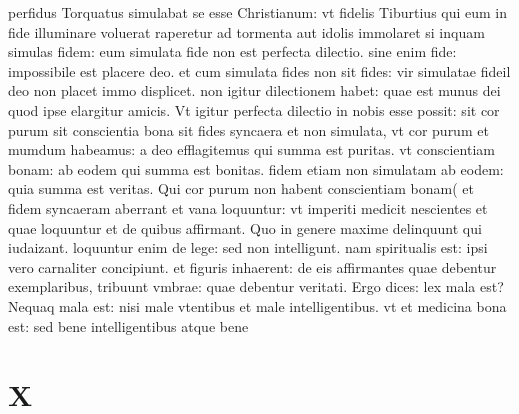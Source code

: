 \documentclass{article}
\begin{document}
\begin{pages}
perfidus Torquatus simulabat se esse Christianum: vt fidelis Tiburtius qui eum in fide illuminare voluerat raperetur ad tormenta aut idolis immolaret si inquam simulas fidem: eum simulata fide non est perfecta dilectio. sine enim fide: impossibile est placere deo. et cum simulata fides non sit fides: vir simulatae fideil deo non placet immo displicet. non igitur dilectionem habet: quae est munus dei quod ipse elargitur amicis. Vt igitur perfecta dilectio in nobis esse possit: sit cor purum sit conscientia bona sit fides syncaera et non simulata, vt cor purum et mumdum habeamus: a deo efflagitemus qui summa est puritas. vt conscientiam bonam: ab eodem qui summa est bonitas. fidem etiam non simulatam ab eodem: quia summa est veritas. Qui cor purum non habent conscientiam bonam( et fidem syncaeram aberrant et vana loquuntur: vt imperiti medicit nescientes et quae loquuntur et de quibus affirmant. Quo in genere maxime delinquunt qui iudaizant. loquuntur enim de lege: sed non intelligunt. nam spiritualis est: ipsi vero carnaliter concipiunt. et figuris inhaerent: de eis affirmantes quae debentur exemplaribus, tribuunt vmbrae: quae debentur veritati. Ergo dices: lex mala est? Nequaq mala est: nisi male vtentibus  et male intelligentibus. vt et medicina bona est: sed bene intelligentibus atque bene  \pend
\section*{X }

\end{pages}
\end{document}
